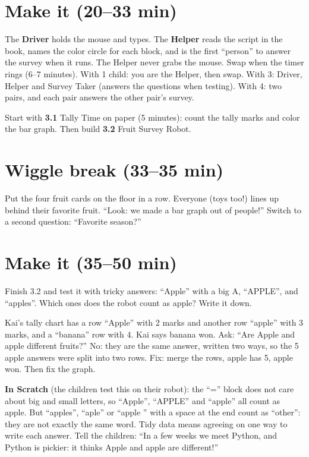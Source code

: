 \section{Make it (20--33 min)}
\begin{pairroles}
The \textbf{Driver} holds the mouse and types. The \textbf{Helper} reads the script in the book, names the color circle for each block, and is the first \enquote{person} to answer the survey when it runs. The Helper never grabs the mouse. Swap when the timer rings (6--7 minutes). With 1 child: you are the Helper, then swap. With 3: Driver, Helper and Survey Taker (answers the questions when testing). With 4: two pairs, and each pair answers the other pair's survey.
\end{pairroles}

Start with \textbf{3.1} Tally Time on paper (5 minutes): count the tally marks and color the bar graph. Then build \textbf{3.2} Fruit Survey Robot.

\section{Wiggle break (33--35 min)}
Put the four fruit cards on the floor in a row. Everyone (toys too!) lines up behind their favorite fruit. \enquote{Look: we made a bar graph out of people!} Switch to a second question: \enquote{Favorite season?}

\section{Make it (35--50 min)}
Finish 3.2 and test it with tricky answers: \enquote{Apple} with a big A, \enquote{APPLE}, and \enquote{apples}. Which ones does the robot count as apple? Write it down.

\begin{bughunt}
Kai's tally chart has a row \enquote{Apple} with 2 marks and another row \enquote{apple} with 3 marks, and a \enquote{banana} row with 4. Kai says banana won. Ask: \enquote{Are Apple and apple different fruits?} No: they are the same answer, written two ways, so the 5 apple answers were split into two rows. Fix: merge the rows, apple has 5, apple won. Then fix the graph.

\textbf{In Scratch} (the children test this on their robot): the \enquote{=} block does not care about big and small letters, so \enquote{Apple}, \enquote{APPLE} and \enquote{apple} all count as apple. But \enquote{apples}, \enquote{aple} or \enquote{apple } with a space at the end count as \enquote{other}: they are not exactly the same word. Tidy data means agreeing on one way to write each answer. Tell the children: \enquote{In a few weeks we meet Python, and Python is pickier: it thinks Apple and apple are different!}
\end{bughunt}

